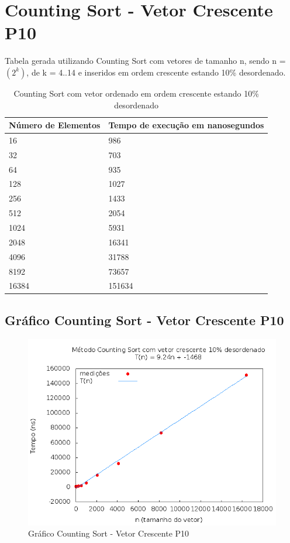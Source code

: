 \documentclass[12pt,a4paper,twoside]{report}
\begin{document}
\section{Counting Sort - Vetor Crescente P10}
Tabela gerada utilizando Counting Sort com vetores de tamanho n, sendo n = $(2^k)$, de k = 4..14 e inseridos em ordem crescente estando 10\% desordenado.
\begin{table}[H]
\centering
\caption{Counting Sort com vetor ordenado em ordem crescente estando 10\% desordenado}
\label{my-label}
\begin{tabular}{|l|l|}
\hline
\multicolumn{1}{|c|}{\textbf{Número de Elementos}} & \multicolumn{1}{c|}{\textbf{Tempo de execução em nanosegundos}} \\ \hline
16 & 986 \\ \hline
32 & 703 \\ \hline
64 & 935 \\ \hline
128 & 1027 \\ \hline
256 & 1433 \\ \hline
512 & 2054 \\ \hline
1024 & 5931 \\ \hline
2048 & 16341 \\ \hline
4096 & 31788 \\ \hline
8192 & 73657 \\ \hline
16384 & 151634 \\ \hline
\end{tabular}
\end{table}

\subsection{Gráfico Counting Sort - Vetor Crescente P10}
\begin{figure}[H]
    \centering
    \includegraphics[width=0.7\linewidth]{graficos/CountingSort/vIntCrescenteP10/vIntCrescenteP10.png}
  \caption{Gráfico Counting Sort - Vetor Crescente P10}
\end{figure}
\end{document}
